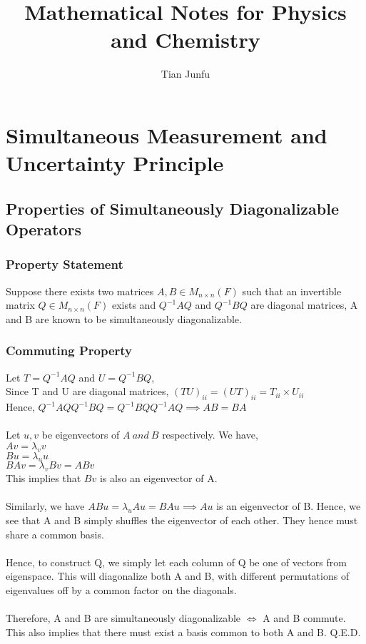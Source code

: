 \documentclass{report}
\begin{document}
\title{Mathematical Notes for Physics and Chemistry}
\author{Tian Junfu}

\maketitle

\chapter{Simultaneous Measurement and Uncertainty Principle}
\section{Properties of Simultaneously Diagonalizable Operators}
\subsection{Property Statement}
Suppose there exists two matrices $A, B \in M_{n \times n}(F)$ such that an invertible matrix $Q \in M_{n \times n}(F)$ exists and $Q^{-1}AQ$ and $Q^{-1}BQ$ are diagonal matrices, A and B are known to be simultaneously diagonalizable.
\subsection{Commuting Property}
Let $T=Q^{-1}AQ$ and $U=Q^{-1}BQ$, \\
Since T and U are diagonal matrices, $(TU)_{ii}=(UT)_{ii}=T_{ii}\times U_{ii}$ \\
Hence, $Q^{-1}AQQ^{-1}BQ=Q^{-1}BQQ^{-1}AQ \implies AB=BA$ \\ \\
Let $u,v$ be eigenvectors of $A\ and\ B$ respectively. We have, \\
$Av=\lambda_{v} v$ \\ 
$Bu=\lambda_{u} u$ \\
$BAv=\lambda_{v}Bv=ABv$ \\
This implies that $Bv$ is also an eigenvector of A. \\ \\
Similarly, we have $ABu=\lambda_{u}Au=BAu \implies Au$ is an eigenvector of B. Hence, we see that A and B simply shuffles the eigenvector of each other. They hence must share a common basis. \\ \\
Hence, to construct Q, we simply let each column of Q be one of vectors from eigenspace. This will diagonalize both A and B, with different permutations of eigenvalues off by a common factor on the diagonals. \\ \\
Therefore, A and B are simultaneously diagonalizable $\iff$ A and B commute. This also implies that there must exist a basis common to both A and B. Q.E.D.
\end{document}
